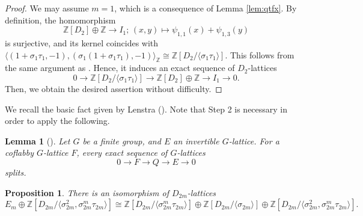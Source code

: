 \documentclass[12pt]{amsart}
\theoremstyle{plain}
\newtheorem{prop}[thm]{Proposition}
\newtheorem{lem}[thm]{Lemma}
\theoremstyle{definition}
\numberwithin{thm}{section}
\numberwithin{equation}{section}
\newcommand{\Z}{\mathbb{Z}}
\begin{document}
\begin{proof}
We may assume $m=1$, which is a consequence of Lemma \ref{lem:qtfx}. By definition, the homomorphism
\begin{equation*}
    \Z[D_{2}]\oplus \Z \rightarrow I_{1};\,(x,y)\mapsto \psi_{1,1}(x)+\psi_{1,3}(y)
\end{equation*}
is surjective, and its kernel coincides with $\langle (1+\sigma_{1}\tau_{1},-1),(\sigma_{1}(1+\sigma_{1}\tau_{1}),-1)\rangle_{\Z}\cong \Z[D_{2}/\langle \sigma_{1}\tau_{1} \rangle]$. This follows from the same argument as \cite[p.~30, \S 2]{Endo2001}. Hence, it induces an exact sequence of $D_{2}$-lattices
\begin{equation*}
    0\rightarrow \Z[D_{2}/\langle \sigma_{1}\tau_{1}\rangle]\rightarrow \Z[D_{2}]\oplus \Z \rightarrow I_{1}\rightarrow 0. 
\end{equation*}
Then, we obtain the desired assertion without difficulty. 
\end{proof}

We recall the basic fact given by Lenstra (\cite{Lenstra1974}). Note that Step 2 is necessary in order to apply the following.

\begin{lem}[{\cite[(1.2) Proposition (c)]{Lenstra1974}}]\label{lem:lstr}
Let $G$ be a finite group, and $E$ an invertible $G$-lattice. For a coflabby $G$-lattice $F$, every exact sequence of $G$-lattices
\begin{equation*}
0\rightarrow F \rightarrow Q \rightarrow E \rightarrow 0
\end{equation*}
splits. 
\end{lem}

\begin{prop}\label{prop:emsp}
There is an isomorphism of $D_{2m}$-lattices
\begin{equation*}
E_{m}\oplus \Z[D_{2m}/\langle \sigma_{2m}^{2},\sigma_{2m}^{m}\tau_{2m}\rangle] \cong \Z[D_{2m}/\langle \sigma_{2m}^{m}\tau_{2m}\rangle]\oplus \Z[D_{2m}/\langle \sigma_{2m}\rangle]\oplus \Z[D_{2m}/\langle \sigma_{2m}^{2},\sigma_{2m}^{m}\tau_{2m}\rangle]. 
\end{equation*}
\end{prop}
\end{document}

